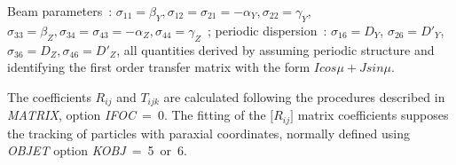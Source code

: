 \smallskip

 Beam parameters~: $\sigma_{11}=\beta_Y, \sigma_{12}=\sigma_{21}=-\alpha_Y, 
\sigma_{22}=\gamma_Y$, $\sigma_{33}=\beta_Z, \sigma_{34}=\sigma_{43}=-\alpha_Z, \sigma_{44}=\gamma_Z$~; periodic dispersion~: 
$\sigma_{16}=D_Y$, $\sigma_{26}=D'_Y$,  $\sigma_{36}=D_Z, \sigma_{46}=D'_Z$, all quantities derived by assuming 
 periodic structure and identifying the first order transfer matrix 
with the form   $I cos \mu + J sin \mu $. 

\smallskip

  The coefficients $ R_{ij} $ and $ T_{ijk} $ are calculated following
the procedures described in \textsl{MATRIX}, option \mbox{\textsl{IFOC} = 0}. 
The fitting of the $ \lbrack R_{ij}\rbrack $ matrix coefficients 
 supposes the tracking of particles with paraxial  coordinates,  normally defined using  
\textsl{OBJET}  option \mbox{\textsl{KOBJ} = 5 or 6}. 





